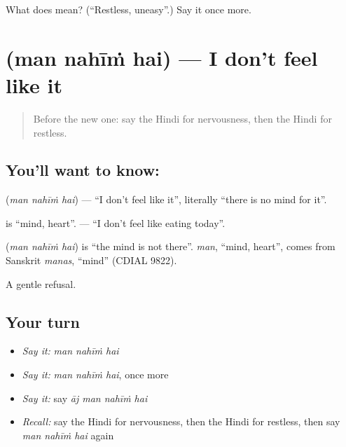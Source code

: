\begin{tcolorbox}[breakable,colback=teal!4,colframe=teal!35!black,title={Before you move on}]
What does  mean? (\textquotedblleft{}Restless, uneasy\textquotedblright{}.) Say it once more.
\end{tcolorbox}
\section[\texorpdfstring{\hi{मन} \hi{नहीं} \hi{है} (man nahīṁ hai)}{मन नहीं है (man nahīṁ hai)}]{   (man nahīṁ hai) — I don't feel like it}

\label{lesson:HI-C125-mannahin}



\begin{quote}
Before the new one: say the Hindi for nervousness, then the Hindi for restless.
\end{quote}

\subsection*{You'll want to know:   }
\textbf{  } (\emph{man nahīṁ hai}) — \textquotedblleft{}I don't feel like it\textquotedblright{}, literally \textquotedblleft{}there is no mind for it\textquotedblright{}.

\textbf{} is \textquotedblleft{}mind, heart\textquotedblright{}. \textbf{     } — \textquotedblleft{}I don't feel like eating today\textquotedblright{}.

\begin{cousinweb}
\textbf{  } (\emph{man nahīṁ hai}) is \textquotedblleft{}the mind is not there\textquotedblright{}. \emph{man}, \textquotedblleft{}mind, heart\textquotedblright{}, comes from Sanskrit \emph{manas}, \textquotedblleft{}mind\textquotedblright{} (CDIAL 9822).
\end{cousinweb}

\begin{grammarlens}[title={What you've built}]
A gentle refusal.
\end{grammarlens}

\subsection*{Your turn}
\begin{itemize}
\raggedright
  \item \emph{Say it:} \emph{man nahīṁ hai}
  \item \emph{Say it:} \emph{man nahīṁ hai}, once more
  \item \emph{Say it:} say \emph{āj man nahīṁ hai}
  \item \emph{Recall:} say the Hindi for nervousness, then the Hindi for restless, then say \emph{man nahīṁ hai} again
\end{itemize}

